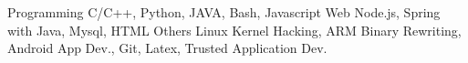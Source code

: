 \begin{cvskills}
  \cvskill
    {Programming}
    {C/C++, Python, JAVA, Bash, Javascript}
  \cvskill
    {Web}
    {Node.js, Spring with Java, Mysql, HTML}
  \cvskill
    {Others}
    {Linux Kernel Hacking, ARM Binary Rewriting, Android App Dev.,  
    Git, Latex, Trusted Application Dev.}
\end{cvskills}
